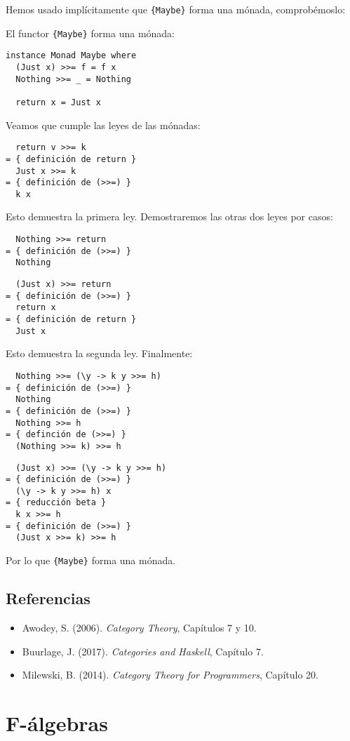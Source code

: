 \documentclass[12pt, twoside]{book}
\newcommand{\code}[1]{\Verb+{#1}+}
\begin{document}
Hemos usado implícitamente que \code{Maybe} forma una mónada, comprobémoslo:
\begin{example}
El functor \code{Maybe} forma una mónada:
\begin{verbatim}
instance Monad Maybe where
  (Just x) >>= f = f x
  Nothing >>= _ = Nothing

  return x = Just x
\end{verbatim}
Veamos que cumple las leyes de las mónadas:
\begin{verbatim}
  return v >>= k 
= { definición de return }
  Just x >>= k
= { definición de (>>=) }
  k x
\end{verbatim}
Esto demuestra la primera ley.
Demostraremos las otras dos leyes por casos:
\begin{verbatim}
  Nothing >>= return
= { definición de (>>=) }
  Nothing
\end{verbatim}
\begin{verbatim}
  (Just x) >>= return
= { definición de (>>=) }
  return x
= { definición de return }
  Just x
\end{verbatim}
Esto demuestra la segunda ley.
Finalmente:
\begin{verbatim}
  Nothing >>= (\y -> k y >>= h)
= { definición de (>>=) }
  Nothing
= { definición de (>>=) }
  Nothing >>= h
= { definción de (>>=) }
  (Nothing >>= k) >>= h
\end{verbatim}
\begin{verbatim}
  (Just x) >>= (\y -> k y >>= h)
= { definición de (>>=) }
  (\y -> k y >>= h) x
= { reducción beta }
  k x >>= h
= { definición de (>>=) }
  (Just x >>= k) >>= h
\end{verbatim}
Por lo que \code{Maybe} forma una mónada.
\end{example}

\section{Referencias}
\begin{itemize}
  \item Awodey, S. (2006). \emph{Category Theory}, Capítulos 7 y 10.
  \item Buurlage, J. (2017). \emph{Categories and Haskell}, Capítulo 7.
  \item Milewski, B. (2014). \emph{Category Theory for Programmers}, Capítulo 20.
\end{itemize}

\chapter{F-álgebras}
\end{document}
